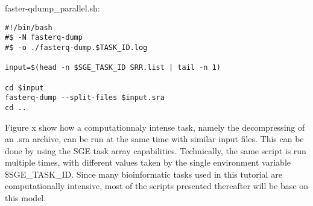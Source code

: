 \noindent faster-qdump\_parallel.sh:
\begin{verbatim}
#!/bin/bash
#$ -N fasterq-dump
#$ -o ./fasterq-dump.$TASK_ID.log
	
input=$(head -n $SGE_TASK_ID SRR.list | tail -n 1)
	
cd $input
fasterq-dump --split-files $input.sra
cd ..
\end{verbatim}


Figure x show how a computationnaly intense task, namely the decompressing of an .sra archive, can be run at the same time with similar input files. This can be done by using the SGE task array capabilities. Technically, the same script is run multiple times, with different values taken by the single environment variable \$SGE\_TASK\_ID. Since many bioinformatic tasks used in this tutorial are computationally intensive, most of the scripts presented thereafter will be base on this model.










